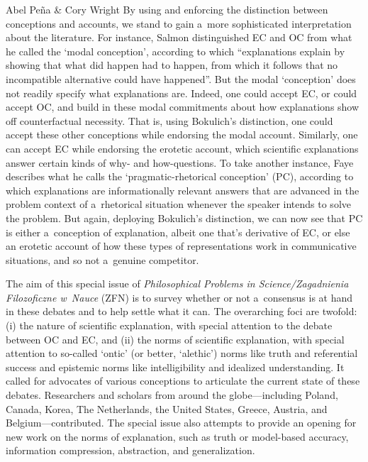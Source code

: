 \begin{editorialeng}{Abel Peña \& Cory Wright}
By using and enforcing the distinction between conceptions and accounts, we stand to gain a~more sophisticated interpretation about the literature. For instance, Salmon
\parencite*[][p.301]{salmon_scientific_1984} %
 distinguished EC and OC from what he called the `modal conception', according to which ``explanations explain by showing that what did happen had to happen, from which it follows that no incompatible alternative could have happened''. But the modal `conception' does not readily specify what explanations are. Indeed, one could accept EC, or could accept OC, and build in these modal commitments about how explanations show off counterfactual necessity. That is, using Bokulich's distinction, one could accept these other conceptions while endorsing the modal account. Similarly, one can accept EC while endorsing the erotetic account, which scientific explanations answer certain kinds of why- and how-questions. To take another instance, Faye 
\parencites*[][]{faye_explanation_1999}[][]{faye_pragmatic-rhetorical_2007} %
 describes what he calls the `pragmatic-rhetorical conception' (PC), according to which explanations are informationally relevant answers that are advanced in the problem context of a~rhetorical situation whenever the speaker intends to solve the problem. But again, deploying Bokulich's distinction, we can now see that PC is either a~conception of explanation, albeit one that's derivative of EC, or else an erotetic account of how these types of representations work in communicative situations, and so not a~genuine competitor.

The aim of this special issue of \textit{Philosophical Problems in Science/Zagadnienia Filozoficzne w~Nauce} (ZFN) is to survey whether or not a~consensus is at hand in these debates and to help settle what it can. The overarching foci are twofold: (i) the nature of scientific explanation, with special attention to the debate between OC and EC, and (ii) the norms of scientific explanation, with special attention to so-called `ontic' (or better, `alethic') norms like truth and referential success and epistemic norms like intelligibility and idealized understanding. It called for advocates of various conceptions to articulate the current state of these debates. Researchers and scholars from around the globe---including Poland, Canada, Korea, The Netherlands, the United States, Greece, Austria, and Belgium---contributed. The special issue also attempts to provide an opening for new work on the norms of explanation, such as truth or model-based accuracy, information compression, abstraction, and generalization.


\end{editorialeng}
